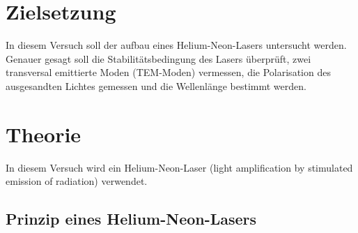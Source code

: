 \section{Zielsetzung}
In diesem Versuch soll der aufbau eines Helium-Neon-Lasers untersucht werden.
Genauer gesagt soll die Stabilitätsbedingung des Lasers überprüft, zwei 
transversal emittierte Moden (TEM-Moden) vermessen, die Polarisation des 
ausgesandten Lichtes gemessen und die Wellenlänge bestimmt werden.

\section{Theorie}
\label{sec:Theorie}

In diesem Versuch wird ein Helium-Neon-Laser (light amplification by stimulated emission 
of radiation) verwendet.

\subsection{Prinzip eines Helium-Neon-Lasers}

